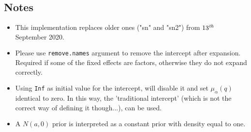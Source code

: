 \documentclass[a4paper,11pt]{article}
\begin{document}


\subsection*{Notes}

\begin{itemize}
\item This implementation replaces older ones ("sn" and "sn2") from
    $13^{\text{\emph{th}}}$ September 2020.
\item Please use \texttt{remove.names} argument to remove the
    intercept after expansion. Required if some of the fixed effects
    are factors, otherwise they do not expand correctly.
\item Using \texttt{Inf} as initial value for the intercept, will
    disable it and set $\mu_{\alpha}(q)$ identical to zero. In this
    way, the 'traditional intercept' (which is not the correct way of
    defining it though...), can be used.
\item A $N(a,0)$ prior is interpreted as a constant prior with density
    equal to one.
\end{itemize}
\end{document}
